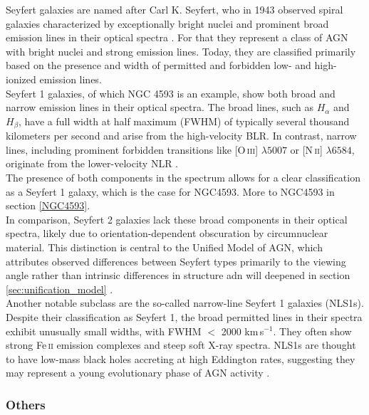 Seyfert galaxies are named after Carl K. Seyfert, who in 1943 observed spiral galaxies characterized by exceptionally bright nuclei and prominent broad emission lines in their optical spectra \parencite{seyfert1943nuclear}. For that they represent a class of AGN with bright nuclei and strong emission lines. Today, they are classified primarily based on the presence and width of permitted and forbidden low- and high-ionized emission lines.\\
Seyfert 1 galaxies, of which NGC 4593 is an example, show both broad and narrow emission lines in their optical spectra. The broad lines, such as $H_\alpha$ and $H_\beta$, have a full width at half maximum (FWHM) of typically several thousand kilometers per second and arise from the high-velocity BLR. In contrast, narrow lines, including prominent forbidden transitions like [O\,\textsc{iii}] $\lambda5007$ or [N\,\textsc{ii}] $\lambda6584$, originate from the lower-velocity NLR \parencite{osterbrock1989agn, peterson1997introduction}.\\
The presence of both components in the spectrum allows for a clear classification as a Seyfert 1 galaxy, which is the case for NGC4593. More to NGC4593 in section \ref{NGC4593}.\\
In comparison, Seyfert 2 galaxies lack these broad components in their optical spectra, likely due to orientation-dependent obscuration by circumnuclear material. This distinction is central to the Unified Model of AGN, which attributes observed differences between Seyfert types primarily to the viewing angle rather than intrinsic differences in structure adn will deepened in section \ref{sec:unification_model} \parencite{antonucci1993unified, urry1995unified}.\\ Another notable subclass are the so-called narrow-line Seyfert 1 galaxies (NLS1s). Despite their classification as Seyfert 1, the broad permitted lines in their spectra exhibit unusually small widths, with FWHM $<$ 2000 km\,s$^{-1}$. They often show strong Fe\,\textsc{ii} emission complexes and steep soft X-ray spectra. NLS1s are thought to have low-mass black holes accreting at high Eddington rates, suggesting they may represent a young evolutionary phase of AGN activity \parencite{osterbrock1985nls1, netzer2013agn}.



\subsubsection{Others}

